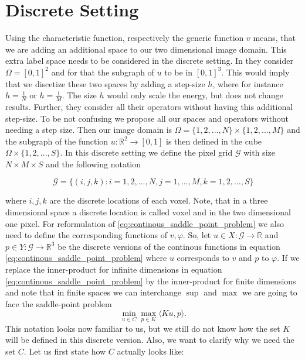 \section{Discrete Setting} %
\label{sec:discrete_setting_ms}

    Using the characteristic function, respectively the generic function $v$ means, that we are adding an additional space to our two dimensional image domain. This extra label space needs to be considered in the discrete setting. In \cite{Pock-et-al-iccv09} they consider $\Omega = [0, 1]^{2}$ and for that the subgraph of $u$ to be in $[0, 1]^{3}$. This would imply that we discetize these two spaces by adding a step-size $h$, where for instance $h = \frac{1}{N}$ or $h = \frac{1}{M}$. The size $h$ would only scale the energy, but does not change results. Further, they consider all their operators without having this additional step-size. To be not confusing we propose all our spaces and operators without needing a step size. Then our image domain is $\Omega = \{1, 2, ..., N\} \times \{1, 2, ..., M\}$ and the subgraph of the function $u: \mathbb{R}^{2} \longrightarrow [0, 1]$ is then defined in the cube $\Omega \times \{1, 2, ..., S\}$. In this discrete setting we define the pixel grid $\mathcal{G}$ with size $N \times M \times S$ and the following notation

        \begin{equation}
            \mathcal{G} = \bigg\{ (i , j , k ): i = 1, 2, ..., N, j = 1, ..., M, k = 1, 2, ..., S \bigg\}
        \end{equation}

    where $i, j, k$ are the discrete locations of each voxel. Note, that in a three dimensional space a discrete location is called voxel and in the two dimensional one pixel.
    For reformulation of \ref{eq:continous_saddle_point_problem} we also need to define the corresponding functions of $v, \varphi$. So, let $u \in X: \mathcal{G} \longrightarrow \mathbb{R}$ and $p \in Y: \mathcal{G} \longrightarrow \mathbb{R}^{3}$ be the discrete versions of the continous functions in equation \ref{eq:continous_saddle_point_problem} where $u$ corresponds to $v$ and $p$ to $\varphi$. If we replace the inner-product for infinite dimensions in equation \ref{eq:continous_saddle_point_problem} by the inner-product for finite dimensions and note that in finite spaces we can interchange $\sup$ and $\max$ we are going to face the saddle-point problem
        \begin{equation}
            \min_{u \in C} \max_{p \in K} \langle Ku, p \rangle.
        \label{eq:mumford_shah_saddle_point_problem}
        \end{equation}
    This notation looks now familiar to us, but we still do not know how the set $K$ will be defined in this discrete version. Also, we want to clarify why we need the set $C$. Let us first state how $C$ actually looks like:

